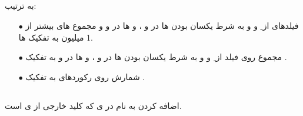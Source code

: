 \documentclass{article}
\begin{document}
\subsection{}
به ترتیب:
\begin{itemize}
    \item [$\bullet$] فیلدهای  از ِ  و  و  به شرط یکسان بودن ها در  و ، و ها در  و  و مجموع های بیشتر از 1 میلیون به تفکیک ها.
    \item [$\bullet$] مجموع روی فیلد  از ِ  و  و  به شرط یکسان بودن ها در  و ، و ها در  و  به تفکیک .
    \item [$\bullet$] شمارش روی رکوردهای  به تفکیک .
\end{itemize}
\subsection{}
اضافه کردن  به نام  در ی  که کلید خارجی از ی  است.

\section{}
\end{document}
